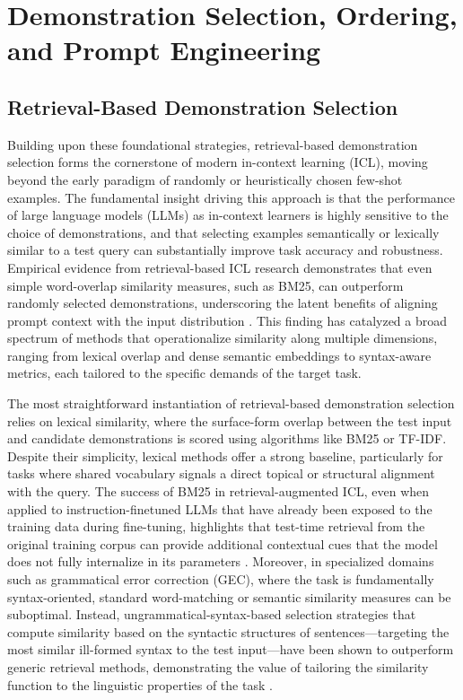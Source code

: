 \documentclass[11pt]{article}
\begin{document}
\section{Demonstration Selection, Ordering, and Prompt Engineering}

\subsection{Retrieval-Based Demonstration Selection}

Building upon these foundational strategies, retrieval-based demonstration selection forms the cornerstone of modern in-context learning (ICL), moving beyond the early paradigm of randomly or heuristically chosen few-shot examples. The fundamental insight driving this approach is that the performance of large language models (LLMs) as in-context learners is highly sensitive to the choice of demonstrations, and that selecting examples semantically or lexically similar to a test query can substantially improve task accuracy and robustness. Empirical evidence from retrieval-based ICL research demonstrates that even simple word-overlap similarity measures, such as BM25, can outperform randomly selected demonstrations, underscoring the latent benefits of aligning prompt context with the input distribution \cite{ref19}. This finding has catalyzed a broad spectrum of methods that operationalize similarity along multiple dimensions, ranging from lexical overlap and dense semantic embeddings to syntax-aware metrics, each tailored to the specific demands of the target task.

The most straightforward instantiation of retrieval-based demonstration selection relies on lexical similarity, where the surface-form overlap between the test input and candidate demonstrations is scored using algorithms like BM25 or TF-IDF. Despite their simplicity, lexical methods offer a strong baseline, particularly for tasks where shared vocabulary signals a direct topical or structural alignment with the query. The success of BM25 in retrieval-augmented ICL, even when applied to instruction-finetuned LLMs that have already been exposed to the training data during fine-tuning, highlights that test-time retrieval from the original training corpus can provide additional contextual cues that the model does not fully internalize in its parameters \cite{ref19}. Moreover, in specialized domains such as grammatical error correction (GEC), where the task is fundamentally syntax-oriented, standard word-matching or semantic similarity measures can be suboptimal. Instead, ungrammatical-syntax-based selection strategies that compute similarity based on the syntactic structures of sentences---targeting the most similar ill-formed syntax to the test input---have been shown to outperform generic retrieval methods, demonstrating the value of tailoring the similarity function to the linguistic properties of the task \cite{ref125}.
\end{document}
